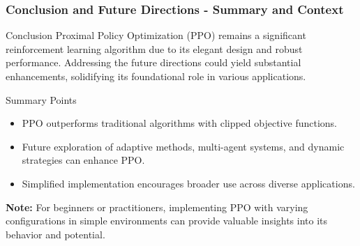 \documentclass{beamer}
\begin{document}
\begin{frame}[fragile]
    \frametitle{Conclusion and Future Directions - Summary and Context}
    \begin{block}{Conclusion}
        Proximal Policy Optimization (PPO) remains a significant reinforcement learning algorithm due to its elegant design and robust performance. Addressing the future directions could yield substantial enhancements, solidifying its foundational role in various applications.
    \end{block}
    
    \begin{block}{Summary Points}
        \begin{itemize}
            \item PPO outperforms traditional algorithms with clipped objective functions.
            \item Future exploration of adaptive methods, multi-agent systems, and dynamic strategies can enhance PPO.
            \item Simplified implementation encourages broader use across diverse applications.
        \end{itemize}
    \end{block}
    
    \textbf{Note:} For beginners or practitioners, implementing PPO with varying configurations in simple environments can provide valuable insights into its behavior and potential.
\end{frame}
\end{document}
